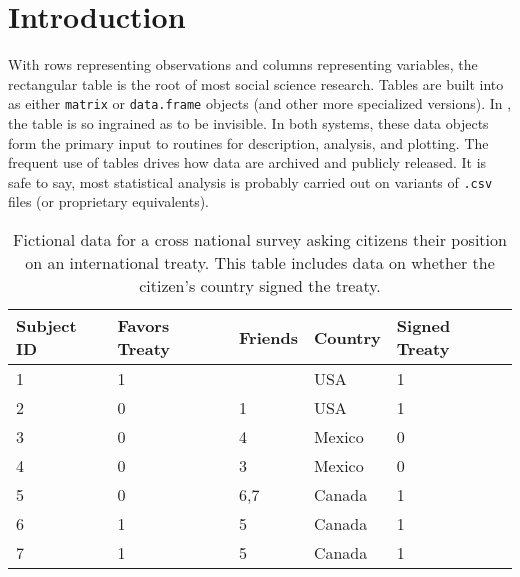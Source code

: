 \documentclass[]{article}
\begin{document}
\maketitle


\section{Introduction}

With rows representing observations and columns representing variables, the rectangular
table is the root of most social science research. Tables are built into \R as
either \texttt{matrix} or \texttt{data.frame} objects (and other more
specialized versions). In \Stata, the table is so ingrained as to be
invisible. In both systems, these data objects form the primary input to
routines for description, analysis, and plotting. The frequent use of tables
drives how data are archived and publicly released. It is safe to say, most statistical analysis
is probably carried out on variants of \texttt{.csv} files (or proprietary
equivalents).

\begin{table}
  \centering
  \begin{tabular}{|l|l|l|l|l|}
  \hline
  Subject ID & Favors Treaty & Friends & Country & Signed Treaty \\\hline
  1          & 1             &         & USA     & 1             \\
  2          & 0             & 1       & USA     & 1             \\
  3          & 0             & 4       & Mexico  & 0             \\
  4          & 0             & 3       & Mexico  & 0             \\
  5          & 0             & 6,7     & Canada  & 1             \\
  6          & 1             & 5       & Canada  & 1             \\
  7          & 1             & 5       & Canada  & 1             \\
  \hline
\end{tabular}
\caption{Fictional data for a cross national survey asking citizens their
position on an international treaty. This table includes data on whether the
citizen's country signed the treaty.}
\label{tab:examplesurvey}
\end{table}
  
\end{document}
